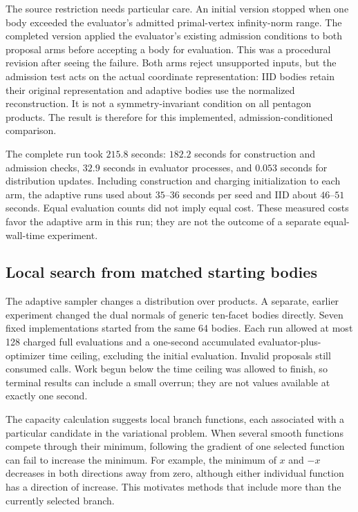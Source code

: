 The source restriction needs particular care. An initial version stopped
when one body exceeded the evaluator's admitted primal-vertex infinity-norm range.
The completed version applied the evaluator's existing admission conditions
to both proposal arms before accepting a body for evaluation. This was a
procedural revision after seeing the failure. Both arms reject unsupported
inputs, but the admission test acts on the actual coordinate representation:
IID bodies retain their original representation and adaptive bodies use the
normalized reconstruction. It is not a symmetry-invariant condition on all
pentagon products. The result is therefore for this implemented,
admission-conditioned comparison.

The complete run took $215.8$ seconds: $182.2$ seconds for construction and
admission checks, $32.9$ seconds in evaluator processes, and $0.053$ seconds
for distribution updates. Including construction and charging initialization
to each arm, the adaptive runs used about $35$--$36$ seconds per seed and IID
about $46$--$51$ seconds. Equal evaluation counts did not imply equal cost.
These measured costs favor the adaptive arm in this run; they are not the
outcome of a separate equal-wall-time experiment.

\subsection{Local search from matched starting bodies}
\label{subsec:black-box-datascience-finite-budget-optimization}

The adaptive sampler changes a distribution over products. A separate,
earlier experiment changed the dual normals of generic ten-facet bodies
directly. Seven fixed implementations started from the same 64 bodies.
Each run allowed at most 128 charged full evaluations and a one-second
accumulated evaluator-plus-optimizer time ceiling, excluding the initial
evaluation. Invalid proposals still consumed calls. Work begun below the
time ceiling was allowed to finish, so terminal results can include a small
overrun; they are not values available at exactly one second.

The capacity calculation suggests local branch functions, each associated
with a particular candidate in the variational problem. When several smooth
functions compete through their minimum, following the gradient of one
selected function can fail to increase the minimum. For example, the minimum
of $x$ and $-x$ decreases in both directions away from zero, although either
individual function has a direction of increase. This motivates methods
that include more than the currently selected branch.

